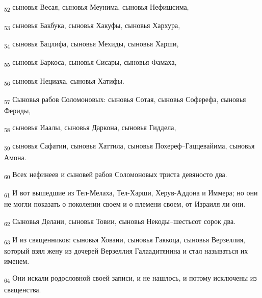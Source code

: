 \begin{tcolorbox}
\textsubscript{52} сыновья Весая, сыновья Меунима, сыновья Нефишсима,
\end{tcolorbox}
\begin{tcolorbox}
\textsubscript{53} сыновья Бакбука, сыновья Хакуфы, сыновья Хархура,
\end{tcolorbox}
\begin{tcolorbox}
\textsubscript{54} сыновья Бацлифа, сыновья Мехиды, сыновья Харши,
\end{tcolorbox}
\begin{tcolorbox}
\textsubscript{55} сыновья Баркоса, сыновья Сисары, сыновья Фамаха,
\end{tcolorbox}
\begin{tcolorbox}
\textsubscript{56} сыновья Нециаха, сыновья Хатифы.
\end{tcolorbox}
\begin{tcolorbox}
\textsubscript{57} Сыновья рабов Соломоновых: сыновья Сотая, сыновья Соферефа, сыновья Фериды,
\end{tcolorbox}
\begin{tcolorbox}
\textsubscript{58} сыновья Иаалы, сыновья Даркона, сыновья Гиддела,
\end{tcolorbox}
\begin{tcolorbox}
\textsubscript{59} сыновья Сафатии, сыновья Хаттила, сыновья Похереф--Гаццевайима, сыновья Амона.
\end{tcolorbox}
\begin{tcolorbox}
\textsubscript{60} Всех нефинеев и сыновей рабов Соломоновых триста девяносто два.
\end{tcolorbox}
\begin{tcolorbox}
\textsubscript{61} И вот вышедшие из Тел-Мелаха, Тел-Харши, Херув-Аддона и Иммера; но они не могли показать о поколении своем и о племени своем, от Израиля ли они.
\end{tcolorbox}
\begin{tcolorbox}
\textsubscript{62} Сыновья Делаии, сыновья Товии, сыновья Некоды--шестьсот сорок два.
\end{tcolorbox}
\begin{tcolorbox}
\textsubscript{63} И из священников: сыновья Ховаии, сыновья Гаккоца, сыновья Верзеллия, который взял жену из дочерей Верзеллия Галаадитянина и стал называться их именем.
\end{tcolorbox}
\begin{tcolorbox}
\textsubscript{64} Они искали родословной своей записи, и не нашлось, и потому исключены из священства.
\end{tcolorbox}
